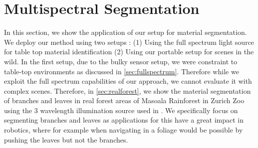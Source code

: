 \section{Multispectral Segmentation}
In this section, we show the application of our setup for material segmentation.
We deploy our method using two setups : (1)  Using the full spectrum light source for table top material identification (2) Using our portable setup for scenes in the wild.
In the first setup, due to the bulky sensor setup, we were constraint to table-top environments as discussed in \Sec \ref{sec:fullspectrum}.
Therefore while we exploit the full spectrum capabilities of our approach, we cannot evaluate it with complex scenes.
Therefore, in \Sec \ref{sec:realforest}, we show the material segmentation of branches and leaves in real forest areas of Masoala Rainforest in Zurich Zoo using the $3$ wavelength illumination source used in \cite{ESL}.
We specifically focus on segmenting branches and leaves as applications for this have a great impact in robotics, where for example when navigating in a foliage would be possible by pushing the leaves but not the branches.

